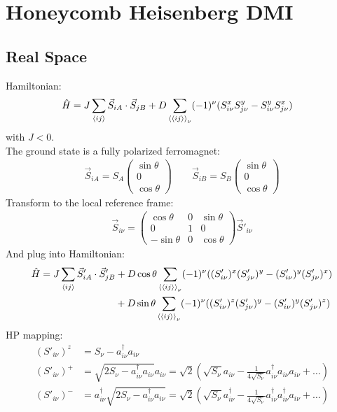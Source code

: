 \documentclass{article}
\begin{document}
\section{Honeycomb Heisenberg DMI}

\subsection{Real Space}

Hamiltonian:
\begin{align}
	\hat H &= J \sum_{\braket{ij}} \vec S_{iA} \cdot \vec S_{jB} + D \sum_{\braket{\braket{ij}}_\nu} (-1)^\nu (S^x_{i\nu} S^y_{j\nu} - S^y_{i\nu} S^x_{j\nu})
\end{align}
with $J < 0$. \\
The ground state is a fully polarized ferromagnet:
\begin{align}
	\vec S_{iA} = S_A \begin{pmatrix}
		\sin\theta \\ 0 \\ \cos\theta
	\end{pmatrix}
	\qquad
	\vec S_{iB} = S_B \begin{pmatrix}
		\sin\theta \\ 0 \\ \cos\theta
	\end{pmatrix}
\end{align}
Transform to the local reference frame:
\begin{align}
	\vec S_{i\nu} = \begin{pmatrix}
		\cos\theta & 0 & \sin\theta \\
		0 & 1 & 0 \\
		-\sin\theta & 0 & \cos\theta
	\end{pmatrix} \vec S'_{i\nu}
\end{align}
And plug into Hamiltonian:
\begin{align}
	\hat H &= J \sum_{\braket{ij}} \vec S'_{iA} \cdot \vec S'_{jB} + D \cos\theta \sum_{\braket{\braket{ij}}_\nu} (-1)^\nu ((S'_{i\nu})^x (S'_{j\nu})^y - (S'_{i\nu})^y (S'_{j\nu})^x) \\
	&\hspace{2.7cm} + D \sin\theta \sum_{\braket{\braket{ij}}_\nu} (-1)^\nu ((S'_{i\nu})^z (S'_{j\nu})^y - (S'_{i\nu})^y (S'_{j\nu})^z)
\end{align}
HP mapping:
\begin{align}
	(S'_{i\nu})^z &= S_\nu - a_{i\nu}^\dagger a_{i\nu} \\
%
	(S'_{i\nu})^+ &= \sqrt{2S_\nu - a_{i\nu}^\dagger a_{i\nu}} a_{i\nu} = \sqrt{2} \left(\sqrt{S_\nu} a_{i\nu} - \frac{1}{4\sqrt{S_\nu}} a_{i\nu}^\dagger a_{i\nu} a_{i\nu} + \dots \right) \\
%
	(S'_{i\nu})^- &= a_{i\nu}^\dagger \sqrt{2S_\nu - a_{i\nu}^\dagger a_{i\nu}} = \sqrt{2} \left(\sqrt{S_\nu} a^\dagger_{i\nu} - \frac{1}{4\sqrt{S_\nu}} a_{i\nu}^\dagger a^\dagger_{i\nu} a_{i\nu} + \dots \right) \\
\end{align}
\end{document}

